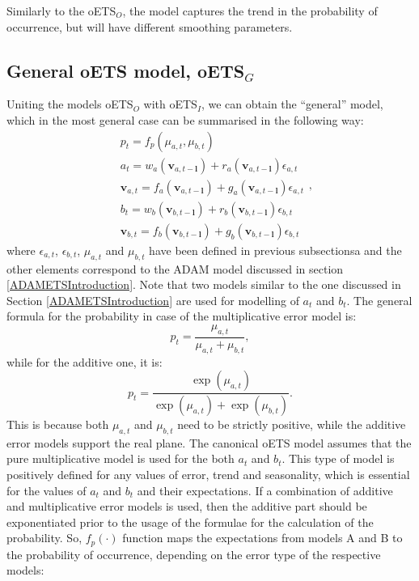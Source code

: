 \documentclass[
]{book}
\theoremstyle{definition}
\theoremstyle{definition}
\theoremstyle{definition}
\theoremstyle{definition}
\theoremstyle{remark}
\begin{document}
Similarly to the oETS\(_O\), the model captures the trend in the probability of occurrence, but will have different smoothing parameters.

\hypertarget{oETSG}{%
\subsection{\texorpdfstring{General oETS model, oETS\(_G\)}{General oETS model, oETS\_G}}\label{oETSG}}

Uniting the models oETS\(_O\) with oETS\(_I\), we can obtain the ``general'' model, which in the most general case can be summarised in the following way:
\begin{equation}
    \begin{aligned}
        & p_t = f_p(\mu_{a,t}, \mu_{b,t}) \\
        & a_t = w_a(\mathbf{v}_{a,t-\boldsymbol{l}}) + r_a(\mathbf{v}_{a,t-\boldsymbol{l}}) \epsilon_{a,t} \\
        & \mathbf{v}_{a,t} = f_a(\mathbf{v}_{a,t-\boldsymbol{l}}) + g_a(\mathbf{v}_{a,t-\boldsymbol{l}}) \epsilon_{a,t} \\
        & b_t = w_b(\mathbf{v}_{b,t-\boldsymbol{l}}) + r_b(\mathbf{v}_{b,t-\boldsymbol{l}}) \epsilon_{b,t} \\
        & \mathbf{v}_{b,t} = f_b(\mathbf{v}_{b,t-\boldsymbol{l}}) + g_b(\mathbf{v}_{b,t-\boldsymbol{l}}) \epsilon_{b,t}
    \end{aligned} ,
  \label{eq:oETSG}
\end{equation}
where \(\epsilon_{a,t}\), \(\epsilon_{b,t}\), \(\mu_{a,t}\) and \(\mu_{b,t}\) have been defined in previous subsectionsa and the other elements correspond to the ADAM model discussed in section \ref{ADAMETSIntroduction}. Note that two models similar to the one discussed in Section \ref{ADAMETSIntroduction} are used for modelling of \(a_t\) and \(b_t\). The general formula for the probability in case of the multiplicative error model is:
\begin{equation}
    p_t = \frac{\mu_{a,t}}{\mu_{a,t}+\mu_{b,t}} ,
  \label{eq:oETSMZZ}
\end{equation}
while for the additive one, it is:
\begin{equation}
    p_t = \frac{\exp(\mu_{a,t})}{\exp(\mu_{a,t})+\exp(\mu_{b,t})} .
  \label{eq:oETSAZZ}
\end{equation}
This is because both \(\mu_{a,t}\) and \(\mu_{b,t}\) need to be strictly positive, while the additive error models support the real plane. The canonical oETS model assumes that the pure multiplicative model is used for the both \(a_t\) and \(b_t\). This type of model is positively defined for any values of error, trend and seasonality, which is essential for the values of \(a_t\) and \(b_t\) and their expectations. If a combination of additive and multiplicative error models is used, then the additive part should be exponentiated prior to the usage of the formulae for the calculation of the probability. So, \(f_p(\cdot)\) function maps the expectations from models A and B to the probability of occurrence, depending on the error type of the respective models:
\end{document}
